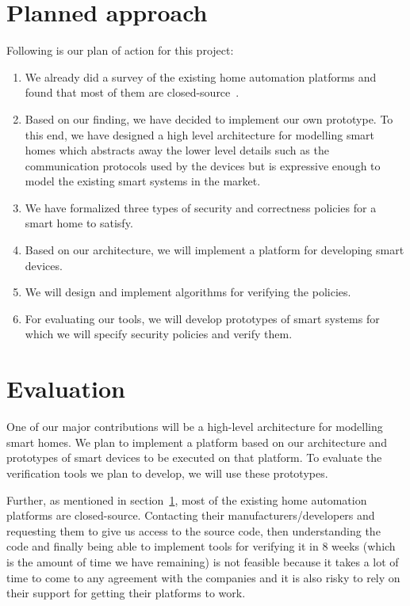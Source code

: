 \documentclass{article}
\begin{document}
\section{Planned approach}
\label{sec:plannedapp}
Following is our plan of action for this project:
\begin{enumerate}
\item We already did a survey of the existing home automation platforms and found that most of them are closed-source~\cite{homeos, echo, wink, homekit, samsung}.  
\item Based on our finding, we have decided to implement our own prototype. To this end, we have designed a high level architecture for modelling smart homes which abstracts away the lower level details such as the communication protocols used by the devices but is expressive enough to model the existing smart systems in the market. 
\item  We have formalized three types of security and correctness policies for a smart home to satisfy. 
\item Based on our architecture, we will implement a platform for developing smart devices.
\item We will design and implement algorithms for verifying the policies.
\item For evaluating our tools, we will develop prototypes of smart systems for which we will specify security policies and verify them.
\end{enumerate}

\section{Evaluation}
One of our major contributions will be a high-level architecture for modelling smart homes. We plan to implement a platform based on our architecture and prototypes of smart devices to be executed on that platform. To evaluate the verification tools we plan to develop, we will use these prototypes. 

Further, as mentioned in section~\ref{sec:plannedapp}, most of the existing home automation platforms are closed-source. Contacting their manufacturers/developers and requesting them to give us access to the source code, then understanding the code and finally being able to implement tools for verifying it in 8 weeks (which is the amount of time we have remaining) is not feasible because it takes a lot of time to come to any agreement with the companies and it is also risky to rely on their support for getting their platforms to work.    
\end{document}
